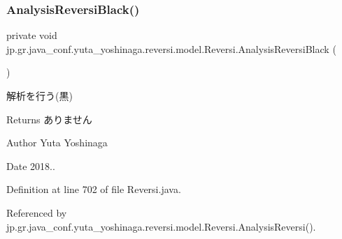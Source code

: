 \subsubsection{\texorpdfstring{Analysis\+Reversi\+Black()}{AnalysisReversiBlack()}}
{\footnotesize\ttfamily private void jp.\+gr.\+java\+\_\+conf.\+yuta\+\_\+yoshinaga.\+reversi.\+model.\+Reversi.\+Analysis\+Reversi\+Black (\begin{DoxyParamCaption}{ }\end{DoxyParamCaption})\hspace{0.3cm}{\ttfamily [private]}}



解析を行う(黒) 

\begin{DoxyReturn}{Returns}
ありません 
\end{DoxyReturn}
\begin{DoxyAuthor}{Author}
Yuta Yoshinaga 
\end{DoxyAuthor}
\begin{DoxyDate}{Date}
2018.. 
\end{DoxyDate}


Definition at line 702 of file Reversi.\+java.



Referenced by jp.\+gr.\+java\+\_\+conf.\+yuta\+\_\+yoshinaga.\+reversi.\+model.\+Reversi.\+Analysis\+Reversi().

